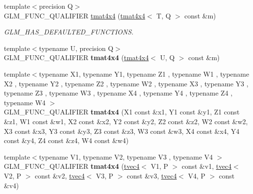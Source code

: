 \begin{DoxyCompactItemize}
\mbox{\label{structglm_1_1tmat4x4_a38fede3f5f8ca53ebc215435945572da}} 
{\footnotesize template$<$precision Q$>$ }\\G\+L\+M\+\_\+\+F\+U\+N\+C\+\_\+\+Q\+U\+A\+L\+I\+F\+I\+ER \hyperlink{structglm_1_1tmat4x4_a38fede3f5f8ca53ebc215435945572da}{tmat4x4} (\hyperlink{structglm_1_1tmat4x4}{tmat4x4}$<$ T, Q $>$ const \&m)
\begin{DoxyCompactList}\small\item\em G\+L\+M\+\_\+\+H\+A\+S\+\_\+\+D\+E\+F\+A\+U\+L\+T\+E\+D\+\_\+\+F\+U\+N\+C\+T\+I\+O\+NS. \end{DoxyCompactList}\item 
\mbox{\label{structglm_1_1tmat4x4_a58ef8d393212acb0d9a3809d1fd05fe4}} 
{\footnotesize template$<$typename U, precision Q$>$ }\\G\+L\+M\+\_\+\+F\+U\+N\+C\+\_\+\+Q\+U\+A\+L\+I\+F\+I\+ER {\bfseries tmat4x4} (\hyperlink{structglm_1_1tmat4x4}{tmat4x4}$<$ U, Q $>$ const \&m)
\item 
\mbox{\label{structglm_1_1tmat4x4_a55fed3aa62bbe056315198d4d7f50db4}} 
{\footnotesize template$<$typename X1, typename Y1, typename Z1 , typename W1 , typename X2 , typename Y2 , typename Z2 , typename W2 , typename X3 , typename Y3 , typename Z3 , typename W3 , typename X4 , typename Y4 , typename Z4 , typename W4 $>$ }\\G\+L\+M\+\_\+\+F\+U\+N\+C\+\_\+\+Q\+U\+A\+L\+I\+F\+I\+ER {\bfseries tmat4x4} (X1 const \&x1, Y1 const \&y1, Z1 const \&z1, W1 const \&w1, X2 const \&x2, Y2 const \&y2, Z2 const \&z2, W2 const \&w2, X3 const \&x3, Y3 const \&y3, Z3 const \&z3, W3 const \&w3, X4 const \&x4, Y4 const \&y4, Z4 const \&z4, W4 const \&w4)
\item 
\mbox{\label{structglm_1_1tmat4x4_ac1a85b66f907df34234fa6860cfa2cf1}} 
{\footnotesize template$<$typename V1, typename V2, typename V3 , typename V4 $>$ }\\G\+L\+M\+\_\+\+F\+U\+N\+C\+\_\+\+Q\+U\+A\+L\+I\+F\+I\+ER {\bfseries tmat4x4} (\hyperlink{structglm_1_1tvec4}{tvec4}$<$ V1, P $>$ const \&v1, \hyperlink{structglm_1_1tvec4}{tvec4}$<$ V2, P $>$ const \&v2, \hyperlink{structglm_1_1tvec4}{tvec4}$<$ V3, P $>$ const \&v3, \hyperlink{structglm_1_1tvec4}{tvec4}$<$ V4, P $>$ const \&v4)
\item 
\mbox{\label{structglm_1_1tmat4x4_a967c1c1711875b670d5a325d86566209}} 

\end{DoxyCompactItemize}

